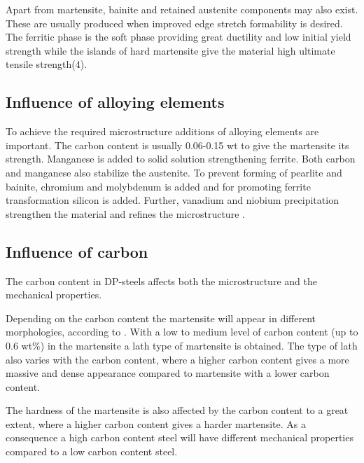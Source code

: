 \documentclass{article}
\begin{document}
Apart from martensite, bainite and retained austenite components may also exist. These are usually produced when improved edge stretch formability is desired.  The ferritic phase is the soft phase providing great ductility and low initial yield strength while the islands of hard martensite give the material high ultimate tensile strength(4). 



\subsection{Influence of alloying elements}
To achieve the required microstructure additions of alloying elements are important. The carbon content is usually 0.06-0.15 wt to give the martensite its strength. Manganese is added to solid solution strengthening ferrite. Both carbon and manganese also stabilize the austenite. To prevent forming of pearlite and bainite, chromium and molybdenum is added and for promoting ferrite transformation silicon is added. Further, vanadium and niobium precipitation strengthen the material and refines the microstructure \cite{BookFlake}. 


\subsection{Influence of carbon}
The carbon content in DP-steels affects both the microstructure and the mechanical properties.  

Depending on the carbon content the martensite will appear in different morphologies, according to \cite{Granbom}. With a low to medium level of carbon content (up to 0.6 wt\%) in the martensite a lath type of martensite is obtained. The type of lath also varies with the carbon content, where a higher carbon content gives a more massive and dense appearance compared to martensite with a lower carbon content. 

The hardness of the martensite is also affected by the carbon content to a great extent, where a higher carbon content gives a harder martensite. As a consequence a high carbon content steel will have different mechanical properties compared to a low carbon content steel. 
\end{document}
